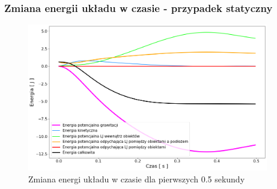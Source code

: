 \documentclass{beamer}
\begin{document}
\begin{frame}
    \frametitle{Zmiana energii układu w czasie - przypadek statyczny}

    \begin{figure}[H]
        \centering
        \includegraphics[width=10.5cm]{pressure_energy_01}
        \caption{
            Zmiana energi układu w czasie dla pierwszych 0.5 sekundy
        }
    \end{figure}
\end{frame}
\end{document}
